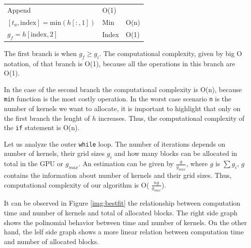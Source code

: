 \documentclass[
  12pt,
  a4paperpaper,
]{report}
\begin{document}
\begin{longtable}[]{@{}lll@{}}
\begin{minipage}[t]{0.24\columnwidth}
Append\strut
\end{minipage} & \begin{minipage}[t]{0.15\columnwidth}\raggedright
O(1)\strut
\end{minipage}\tabularnewline
\begin{minipage}[t]{0.52\columnwidth}\raggedright
\([ t_a, \mathrm{index}] = \mathrm{min}( h[:,1] )\)\strut
\end{minipage} & \begin{minipage}[t]{0.24\columnwidth}\raggedright
Min\strut
\end{minipage} & \begin{minipage}[t]{0.15\columnwidth}\raggedright
O(n)\strut
\end{minipage}\tabularnewline
\begin{minipage}[t]{0.52\columnwidth}\raggedright
\(g_f = h[ \mathrm{index}, 2]\)\strut
\end{minipage} & \begin{minipage}[t]{0.24\columnwidth}\raggedright
Index\strut
\end{minipage} & \begin{minipage}[t]{0.15\columnwidth}\raggedright
O(1)\strut
\end{minipage}\tabularnewline
\bottomrule
\end{longtable}

The first branch is when \(g_f \geq g_i\). The computational complexity,
given by big O notation, of that branch is O(1), because all the
operations in this branch are O(1).

In the case of the second branch the computational complexity is O(n),
because \texttt{min} function is the most costly operation. In the worst
case scenario \texttt{n} is the number of kernels we want to allocate,
it is important to highlight that only on the first branch the lenght of
\(h\) increases. Thus, the computational complexity of the \texttt{if}
statement is O(n).

Let us analyze the outer \texttt{while} loop. The number of iterations
depends on number of kernels, their grid sizes \(g_i\) and how many
blocks can be allocated in total in the GPU or \(g_{max}\). An
estimation can be given by \(\frac{g}{g_{max}}\), where \(g\) is
\(\sum g_i\), \(g\) contains the information about number of kernels and
their grid sizes. Thus, computational complexity of our algorithm is O(
\(\frac{ng}{g_{max}}\)).

It can be observed in Figure \ref{img:bestfit} the relationship between
computation time and number of kernels and total of allocated blocks.
The right side graph shows the polinomial behavior between time and
number of kernels. On the other hand, the lelf side graph shows a more
linear relation between computation time and number of allocated blocks.
\end{document}
